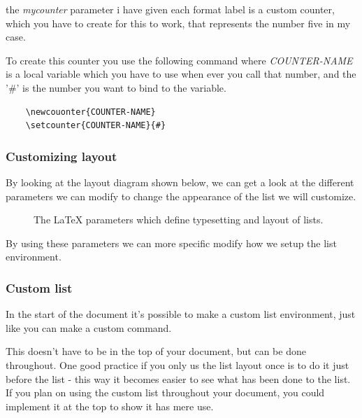 the \textit{mycounter} parameter i have given each format label is a custom counter, which you have to create for this to work, 
that represents the number five in my case.

To create this counter you use the following command where \textit{COUNTER-NAME} is a local variable which you have to use when ever you call that number, and the '\#' is the number you want to bind to the variable.
\begin{verbatim}
    \newcouonter{COUNTER-NAME}
    \setcounter{COUNTER-NAME}{#}
\end{verbatim}
    
\subsubsection{Customizing layout}
By looking at the layout diagram shown below, we can get a look at the different parameters we can modify to change the appearance of the list we will customize. \\

\begin{figure} [H]
    \listdiagram
    \caption{The \LaTeX{} parameters which define typesetting and layout of lists.} 
    \label{fig:list_diagram}
\end{figure}

By using these parameters we can more specific modify how we setup the list environment. 

\subsubsection{Custom list}
In the start of the document it's possible to make a custom list environment, just like you can make a custom command.

This doesn't have to be in the top of your document, but can be done throughout. One good practice if you only us the list layout once is to do it just before the list - this way it becomes easier to see what has been done to the list. If you plan on using the custom list throughout your document, you could implement it at the top to show it has mere use.

